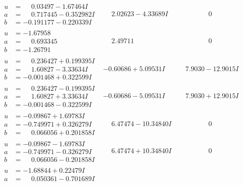 \documentclass[1p]{elsarticle_modified}
\theoremstyle{definition}
\begin{document}
$$\begin{array}{c|c|c}
 \hline 
\begin{aligned}
u &= \phantom{-}0.03497 - 1.67464 I \\
a &= \phantom{-}0.717445 - 0.352982 I \\
b &= -0.191177 - 0.220339 I\end{aligned}
 & \phantom{-}2.02623 - 4.33689 I & \phantom{-0.000000 } 0 \\ \hline\begin{aligned}
u &= -1.67958\phantom{ +0.000000I} \\
a &= \phantom{-}0.693345\phantom{ +0.000000I} \\
b &= -1.26791\phantom{ +0.000000I}\end{aligned}
 & \phantom{-}2.49711\phantom{ +0.000000I} & \phantom{-0.000000 } 0 \\ \hline\begin{aligned}
u &= \phantom{-}0.236427 + 0.199395 I \\
a &= \phantom{-}1.60827 - 3.33634 I \\
b &= -0.001468 + 0.322599 I\end{aligned}
 & -0.60686 + 5.09531 I & \phantom{-}7.9030 - 12.9015 I \\ \hline\begin{aligned}
u &= \phantom{-}0.236427 - 0.199395 I \\
a &= \phantom{-}1.60827 + 3.33634 I \\
b &= -0.001468 - 0.322599 I\end{aligned}
 & -0.60686 - 5.09531 I & \phantom{-}7.9030 + 12.9015 I \\ \hline\begin{aligned}
u &= -0.09867 + 1.69783 I \\
a &= -0.749971 + 0.326279 I \\
b &= \phantom{-}0.066056 + 0.201858 I\end{aligned}
 & \phantom{-}6.47474 - 10.34840 I & \phantom{-0.000000 } 0 \\ \hline\begin{aligned}
u &= -0.09867 - 1.69783 I \\
a &= -0.749971 - 0.326279 I \\
b &= \phantom{-}0.066056 - 0.201858 I\end{aligned}
 & \phantom{-}6.47474 + 10.34840 I & \phantom{-0.000000 } 0 \\ \hline\begin{aligned}
u &= -1.68844 + 0.22479 I \\
a &= \phantom{-}0.050361 - 0.701689 I \\

\end{aligned}
\end{array}$$
\end{document}

